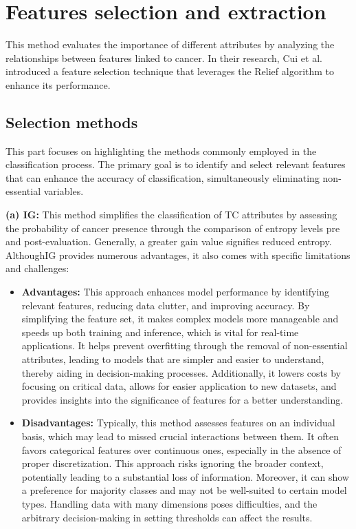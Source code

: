 \documentclass[a4paper,fleqn]{cas-sc}
\begin{document}
\section{Features selection and extraction} \label{sec4}
This method evaluates the importance of different attributes by analyzing the relationships between features linked to cancer. In their research, Cui et al. \cite{cui2018ovarian} introduced a feature selection technique that leverages the Relief algorithm to enhance its performance.

\subsection{Selection methods}
This part focuses on highlighting the methods commonly employed in the classification process. The primary goal is to identify and select relevant features that can enhance the accuracy of classification, simultaneously eliminating non-essential variables.

\noindent \textbf{(a)  \Ac{IG}:} This method simplifies the classification of TC attributes by assessing the probability of cancer presence through the comparison of entropy levels pre and post-evaluation. Generally, a greater gain value signifies reduced entropy. Although\ac{IG} provides numerous advantages, it also comes with specific limitations and challenges:


\begin{itemize}
    \item \textbf{Advantages:} This approach enhances model performance by identifying relevant features, reducing data clutter, and improving accuracy. By simplifying the feature set, it makes complex models more manageable and speeds up both training and inference, which is vital for real-time applications. It helps prevent overfitting through the removal of non-essential attributes, leading to models that are simpler and easier to understand, thereby aiding in decision-making processes. Additionally, it lowers costs by focusing on critical data, allows for easier application to new datasets, and provides insights into the significance of features for a better understanding.
    
    \item \textbf{Disadvantages:} Typically, this method assesses features on an individual basis, which may lead to missed crucial interactions between them. It often favors categorical features over continuous ones, especially in the absence of proper discretization. This approach risks ignoring the broader context, potentially leading to a substantial loss of information. Moreover, it can show a preference for majority classes and may not be well-suited to certain model types. Handling data with many dimensions poses difficulties, and the arbitrary decision-making in setting thresholds can affect the results.
\end{itemize}
\end{document}
